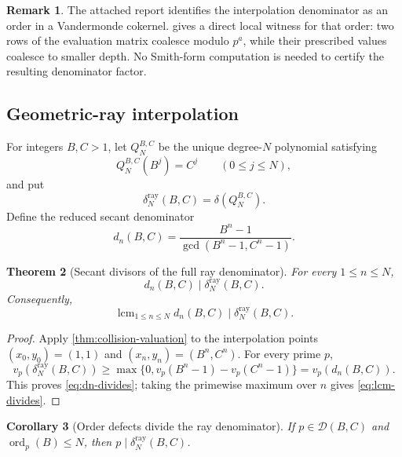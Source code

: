 \documentclass[11pt]{article}
\newtheorem{theorem}{Theorem}[section]
\newtheorem{corollary}[theorem]{Corollary}
\theoremstyle{definition}
\newtheorem{remark}[theorem]{Remark}
\newcommand{\ord}{\operatorname{ord}}
\newcommand{\lcm}{\operatorname{lcm}}
\newcommand{\Def}{\mathcal D}
\newcommand{\raydelta}{\delta^{\mathrm{ray}}}
\begin{document}
\begin{remark}
The attached report identifies the interpolation denominator as an order in a Vandermonde
cokernel.   gives a direct local witness for that order: two
rows of the evaluation matrix coalesce modulo $p^a$, while their prescribed values coalesce
to smaller depth.  No Smith-form computation is needed to certify the resulting denominator
factor.
\end{remark}

\subsection{Geometric-ray interpolation}

For integers $B,C>1$, let $Q_N^{B,C}$ be the unique degree-$N$ polynomial satisfying
\begin{equation}
 Q_N^{B,C}(B^j)=C^j
 \qquad(0\le j\le N),
 \label{eq:ray-interpolation}
\end{equation}
and put
\[
 \raydelta_N(B,C)=\delta(Q_N^{B,C}).
\]
Define the reduced secant denominator
\begin{equation}
 d_n(B,C)=\frac{B^n-1}{\gcd(B^n-1,C^n-1)}.
 \label{eq:secant-denom}
\end{equation}

\begin{theorem}[Secant divisors of the full ray denominator]
\label{thm:secant-divides}
For every $1\le n\le N$,
\begin{equation}
 d_n(B,C)\mid\raydelta_N(B,C).
 \label{eq:dn-divides}
\end{equation}
Consequently,
\begin{equation}
 \lcm_{1\le n\le N}d_n(B,C)
 \mid\raydelta_N(B,C).
 \label{eq:lcm-divides}
\end{equation}
\end{theorem}

\begin{proof}
Apply \cref{thm:collision-valuation} to the interpolation points
$(x_0,y_0)=(1,1)$ and $(x_n,y_n)=(B^n,C^n)$.  For every prime $p$,
\[
 v_p(\raydelta_N(B,C))
 \ge\max\{0,v_p(B^n-1)-v_p(C^n-1)\}
 =v_p(d_n(B,C)).
\]
This proves \eqref{eq:dn-divides}; taking the primewise maximum over $n$ gives
\eqref{eq:lcm-divides}.
\end{proof}

\begin{corollary}[Order defects divide the ray denominator]
\label{cor:defect-divides-ray}
If $p\in\Def(B,C)$ and $\ord_p(B)\le N$, then
$p\mid\raydelta_N(B,C)$.
\end{corollary}
\end{document}
